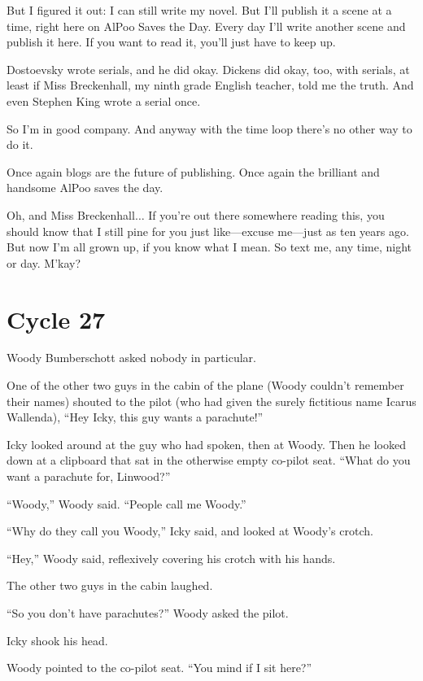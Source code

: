 But I figured it out: I can still write my novel. But I'll publish it a scene at a time, right here on AlPoo Saves the Day. Every day I'll write another scene and publish it here. If you want to read it, you'll just have to keep up.

Dostoevsky wrote serials, and he did okay. Dickens did okay, too, with serials, at least if Miss Breckenhall, my ninth grade English teacher, told me the truth. And even Stephen King wrote a serial once.

So I'm in good company. And anyway with the time loop there's no other way to do it.

Once again blogs are the future of publishing. Once again the brilliant and handsome AlPoo saves the day.

Oh, and Miss Breckenhall$\ldots$ If you're out there somewhere reading this, you should know that I still pine for you just like—excuse me—just as ten years ago. But now I'm all grown up, if you know what I mean. So text me, any time, night or day. M'kay?

\chapter{Cycle 27}


 Woody Bumberschott asked nobody in particular.

One of the other two guys in the cabin of the plane (Woody couldn't remember their names) shouted to the pilot (who had given the surely fictitious name Icarus Wallenda), ``Hey Icky, this guy wants a parachute!''

Icky looked around at the guy who had spoken, then at Woody. Then he looked down at a clipboard that sat in the otherwise empty co-pilot seat. ``What do you want a parachute for, Linwood?''

``Woody,'' Woody said. ``People call me Woody.''

``Why do they call you Woody,'' Icky said, and looked at Woody's crotch.

``Hey,'' Woody said, reflexively covering his crotch with his hands.

The other two guys in the cabin laughed.

``So you don't have parachutes?'' Woody asked the pilot.

Icky shook his head.

Woody pointed to the co-pilot seat. ``You mind if I sit here?''

